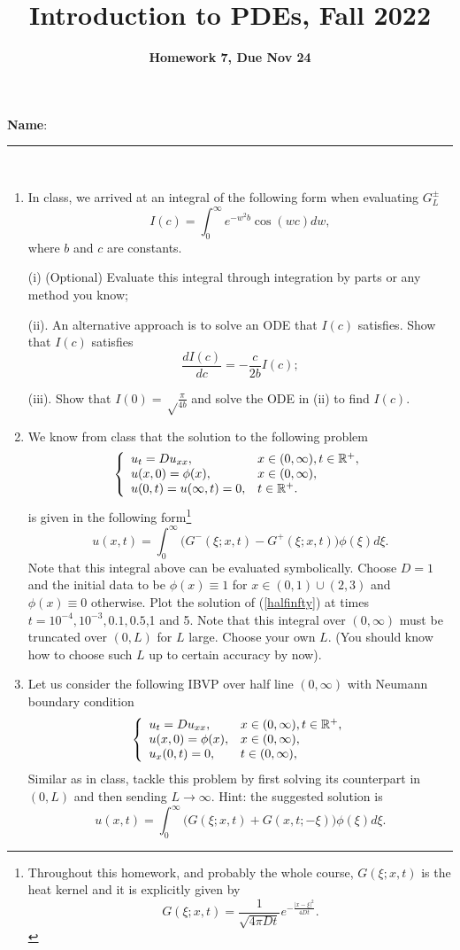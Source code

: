 \documentclass[6pt]{article}
\title{Introduction to PDEs, Fall 2022}
\author{\textbf{Homework 7, Due Nov 24}}
\date{}
\numberwithin{equation}{section}
\def\mathbb{\Bbb}
\begin{document}
\maketitle

\textbf{Name}:\rule{1 in}{0.001 in} \\
\begin{enumerate}

\item In class, we arrived at an integral of the following form when evaluating $G^{\pm}_L$
\[I(c)=\int_0^\infty e^{-w^2b} \cos (wc) dw,\]
where $b$ and $c$ are constants.

(i) (Optional) Evaluate this integral through integration by parts or any method you know;

(ii).  An alternative approach is to solve an ODE that $I(c)$ satisfies.  Show that $I(c)$ satisfies
\[\frac{dI(c)}{dc}=-\frac{c}{2b}I(c);\]

(iii).  Show that $I(0)=\sqrt \frac{\pi}{4b}$ and solve the ODE in (ii) to find $I(c)$.

\item We know from class that the solution to the following problem
\begin{equation}\label{halfinfty}
\left\{
\begin{array}{ll}
u_t=D u_{xx},& x\in (0,\infty), t\in\mathbb R^+,\\
u(x,0)=\phi(x),&x \in (0,\infty),\\
u(0,t)=u(\infty,t)=0,&t\in\mathbb R^+.
\end{array}
\right.
\end{equation}
is given in the following form\footnote{Throughout this homework, and probably the whole course, $G(\xi;x,t)$ is the heat kernel and it is explicitly given by
\[G(\xi;x,t)=\frac{1}{\sqrt{4\pi Dt}}e^{-\frac{|x-\xi|^2}{4Dt}}.\]}
\[u(x,t)=\int_0^\infty \big(G^-(\xi;x,t)-G^+(\xi;x,t)\big)\phi(\xi)d\xi.\]
Note that this integral above can be evaluated symbolically.  Choose $D=1$ and the initial data to be $\phi(x)\equiv 1$ for $x\in(0,1)\cup(2,3)$ and $\phi(x)\equiv0$ otherwise.  Plot the solution of (\ref{halfinfty}) at times $t=10^{-4},10^{-3},0.1,0.5$,1 and 5.  Note that this integral over $(0,\infty)$ must be truncated over $(0,L)$ for $L$ large.  Choose your own $L$.  (You should know how to choose such $L$ up to certain accuracy by now).


\item  Let us consider the following IBVP over half line $(0,\infty)$ with Neumann boundary condition
\begin{equation}\label{NBC}
\left\{
\begin{array}{ll}
u_t=D u_{xx},& x\in (0,\infty), t\in\mathbb R^+,\\
u(x,0)=\phi(x),&x \in (0,\infty),\\
u_x(0,t)=0,&t\in(0,\infty),
\end{array}
\right.
\end{equation}
Similar as in class, tackle this problem by first solving its counterpart in $(0,L)$ and then sending $L\rightarrow\infty$.  Hint: the suggested solution is
\[u(x,t)=\int_0^\infty \Big(G(\xi;x,t)+G(x,t;-\xi)\Big)\phi(\xi)d\xi.\]


\end{enumerate}
\end{document}
